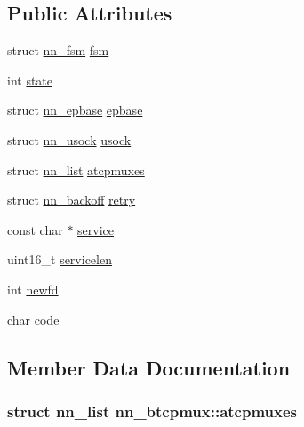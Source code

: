 \subsection*{Public Attributes}
\begin{DoxyCompactItemize}
\item 
struct \hyperlink{structnn__fsm}{nn\+\_\+fsm} \hyperlink{structnn__btcpmux_ad05869d3010457846d3f0b4a9dbb61e3}{fsm}
\item 
int \hyperlink{structnn__btcpmux_afc599be6405e8a1646274ab3a378ed87}{state}
\item 
struct \hyperlink{structnn__epbase}{nn\+\_\+epbase} \hyperlink{structnn__btcpmux_a0228259a8bfcdb9a2f7863ff48e6a7ae}{epbase}
\item 
struct \hyperlink{structnn__usock}{nn\+\_\+usock} \hyperlink{structnn__btcpmux_ab566e4fee610dd8580194d14a4ee2417}{usock}
\item 
struct \hyperlink{structnn__list}{nn\+\_\+list} \hyperlink{structnn__btcpmux_adf2c3cbed0a8498e5963b3abd45c1408}{atcpmuxes}
\item 
struct \hyperlink{structnn__backoff}{nn\+\_\+backoff} \hyperlink{structnn__btcpmux_a910b39218598d10125dd5ff82b33914e}{retry}
\item 
const char $\ast$ \hyperlink{structnn__btcpmux_a7b397ca4f026d6da4959f031ff9e759d}{service}
\item 
uint16\+\_\+t \hyperlink{structnn__btcpmux_a6908f0b688e86cbab503cec8bae0afbd}{servicelen}
\item 
int \hyperlink{structnn__btcpmux_a996d4e690af37aad865017b598a14189}{newfd}
\item 
char \hyperlink{structnn__btcpmux_a33ca4d6da08be0f9da1b140f445c30a0}{code}
\end{DoxyCompactItemize}


\subsection{Member Data Documentation}
\subsubsection[{atcpmuxes}]{\setlength{\rightskip}{0pt plus 5cm}struct {\bf nn\+\_\+list} nn\+\_\+btcpmux\+::atcpmuxes}\hypertarget{structnn__btcpmux_adf2c3cbed0a8498e5963b3abd45c1408}{}\label{structnn__btcpmux_adf2c3cbed0a8498e5963b3abd45c1408}
